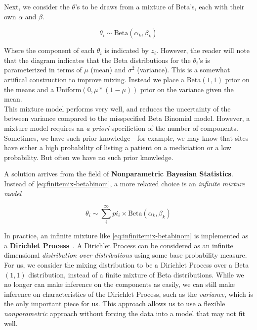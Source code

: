 \documentclass{article}
\begin{document}
Next, we consider the $\theta$'s to be draws from a mixture of Beta's, each with their own $\alpha$ and $\beta$.

\begin{equation}\label{eq:theta}
    \theta_i \sim \text{Beta}(\alpha_k, \beta_k)
\end{equation}

Where the component of each $\theta_i$ is indicated by $z_i$. However, the reader will note that the diagram indicates that the Beta distributions for the $\theta_i$'s is parameterized in terms of $\mu$ (mean) and $\sigma^2$ (variance). This is a somewhat artifical construction to improve mixing. Instead we place a Beta$(1, 1)$ prior on the means and a Uniform$(0, \mu * (1-\mu))$ prior on the variance given the mean. \\

This mixture model performs very well, and reduces the uncertainty of the between variance compared to the misspecified Beta Binomial model. However, a mixture model requires an \textit{a priori} specifiction of the number of components. Sometimes, we have such prior knowledge - for example, we may know that sites have either a high probability of listing a patient on a mediciation or a low probability. But often we have no such prior knowledge. 

A solution arrives from the field of \textbf{Nonparametric Bayesian Statistics}. Instead of \eqref{eq:finitemix-betabinom}, a more relaxed choice is an \textit{infinite mixture model}

\begin{equation}\label{eq:infinitemix-betabinom}
\theta_i \sim \sum_i^{\infty} pi_i \times \text{Beta}(\alpha_k, \beta_k)
\end{equation}

In practice, an infinite mixture like \eqref{eq:infinitemix-betabinom} is implemented as a \textbf{Dirichlet Process}~\cite{gelman2004,ohlssen2007}. A Dirichlet Process can be considered as an infinite dimensional \textit{distribution over distributions} using some base probability measure. For us, we consider the mixing distribution to be a Dirichlet Process over a Beta$(1, 1)$ distribution, instead of a finite mixture of Beta distributions. While we no longer can make inference on the components as easily, we can still make inference on characteristics of the Dirichlet Process, such as the \textit{variance}, which is the only important piece for us. This approach allows us to use a flexible \textit{nonparametric} approach without forcing the data into a model that may not fit well.
\end{document}
